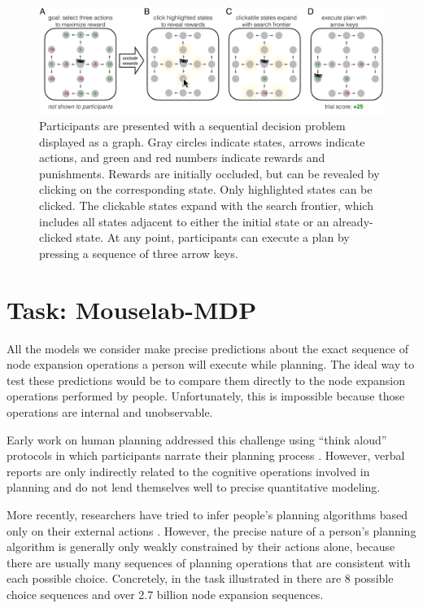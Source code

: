 \begin{figure}[t!]
    \centering
    \includegraphics[width=\textwidth]{figs/planning/fig2.pdf}
    \caption{
     Participants are presented with a sequential decision problem displayed as a graph. Gray circles indicate states, arrows indicate actions, and green and red numbers indicate rewards and punishments.
     Rewards are initially occluded, but can be revealed by clicking on the corresponding state. Only highlighted states can be clicked.
     The clickable states expand with the search frontier, which includes all states adjacent to either the initial state or an already-clicked state.
     At any point, participants can execute a plan by pressing a sequence of three arrow keys.}
    \label{fig:planning-task}
\end{figure}


\section{Task: Mouselab-MDP}\label{sec:planning-task}
All the models we consider make precise predictions about the exact sequence of node expansion operations a person will execute while planning. The ideal way to test these predictions would be to compare them directly to the node expansion operations performed by people. Unfortunately, this is impossible because those operations are internal and unobservable.

Early work on human planning addressed this challenge using ``think aloud'' protocols in which participants narrate their planning process \citep{degroot1965thought,newell1972human,chase1973perception}. However, verbal reports are only indirectly related to the cognitive operations involved in planning and do not lend themselves well to precise quantitative modeling.

More recently, researchers have tried to infer people's planning algorithms based only on their external actions \citep{huys2012bonsai,huys2015interplay,daw2005uncertaintybased,solway2015evidence,snider2015prospective,vanopheusden2017computational}. However, the precise nature of a person's planning algorithm is generally only weakly constrained by their actions alone, because there are usually many sequences of planning operations that are consistent with each possible choice. Concretely, in the task illustrated in  there are 8 possible choice sequences and over 2.7 billion node expansion sequences.

